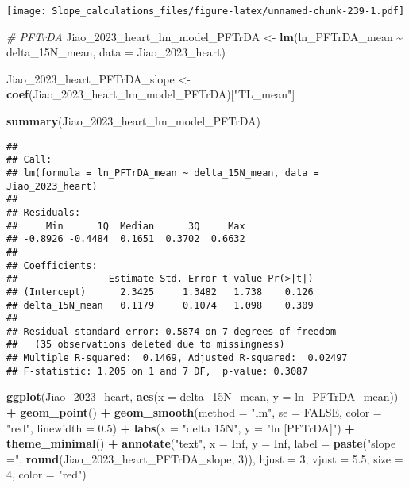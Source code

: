 \documentclass[
]{article}
\newenvironment{Shaded}{\begin{snugshade}}{\end{snugshade}}
\newcommand{\AttributeTok}[1]{\textcolor[rgb]{0.13,0.29,0.53}{#1}}
\newcommand{\CommentTok}[1]{\textcolor[rgb]{0.56,0.35,0.01}{\textit{#1}}}
\newcommand{\ConstantTok}[1]{\textcolor[rgb]{0.56,0.35,0.01}{#1}}
\newcommand{\DecValTok}[1]{\textcolor[rgb]{0.00,0.00,0.81}{#1}}
\newcommand{\FloatTok}[1]{\textcolor[rgb]{0.00,0.00,0.81}{#1}}
\newcommand{\FunctionTok}[1]{\textcolor[rgb]{0.13,0.29,0.53}{\textbf{#1}}}
\newcommand{\NormalTok}[1]{#1}
\newcommand{\OtherTok}[1]{\textcolor[rgb]{0.56,0.35,0.01}{#1}}
\newcommand{\SpecialCharTok}[1]{\textcolor[rgb]{0.81,0.36,0.00}{\textbf{#1}}}
\newcommand{\StringTok}[1]{\textcolor[rgb]{0.31,0.60,0.02}{#1}}
\begin{document}
\texttt{[image: Slope\_calculations\_files/figure-latex/unnamed-chunk-239-1.pdf]}

\begin{Shaded}
\begin{Highlighting}[]
\CommentTok{\# PFTrDA}
\NormalTok{Jiao\_2023\_heart\_lm\_model\_PFTrDA }\OtherTok{\textless{}{-}} \FunctionTok{lm}\NormalTok{(ln\_PFTrDA\_mean }\SpecialCharTok{\textasciitilde{}}\NormalTok{ delta\_15N\_mean,}
                                    \AttributeTok{data =}\NormalTok{ Jiao\_2023\_heart)}

\NormalTok{Jiao\_2023\_heart\_PFTrDA\_slope }\OtherTok{\textless{}{-}} \FunctionTok{coef}\NormalTok{(Jiao\_2023\_heart\_lm\_model\_PFTrDA)[}\StringTok{"TL\_mean"}\NormalTok{]}

\FunctionTok{summary}\NormalTok{(Jiao\_2023\_heart\_lm\_model\_PFTrDA)}
\end{Highlighting}
\end{Shaded}

\begin{verbatim}
## 
## Call:
## lm(formula = ln_PFTrDA_mean ~ delta_15N_mean, data = Jiao_2023_heart)
## 
## Residuals:
##     Min      1Q  Median      3Q     Max 
## -0.8926 -0.4484  0.1651  0.3702  0.6632 
## 
## Coefficients:
##                Estimate Std. Error t value Pr(>|t|)
## (Intercept)      2.3425     1.3482   1.738    0.126
## delta_15N_mean   0.1179     0.1074   1.098    0.309
## 
## Residual standard error: 0.5874 on 7 degrees of freedom
##   (35 observations deleted due to missingness)
## Multiple R-squared:  0.1469, Adjusted R-squared:  0.02497 
## F-statistic: 1.205 on 1 and 7 DF,  p-value: 0.3087
\end{verbatim}

\begin{Shaded}
\begin{Highlighting}[]
\FunctionTok{ggplot}\NormalTok{(Jiao\_2023\_heart, }\FunctionTok{aes}\NormalTok{(}\AttributeTok{x =}\NormalTok{ delta\_15N\_mean, }\AttributeTok{y =}\NormalTok{ ln\_PFTrDA\_mean)) }\SpecialCharTok{+}
  \FunctionTok{geom\_point}\NormalTok{() }\SpecialCharTok{+}
  \FunctionTok{geom\_smooth}\NormalTok{(}\AttributeTok{method =} \StringTok{"lm"}\NormalTok{, }\AttributeTok{se =} \ConstantTok{FALSE}\NormalTok{, }\AttributeTok{color =} \StringTok{"red"}\NormalTok{, }\AttributeTok{linewidth =} \FloatTok{0.5}\NormalTok{) }\SpecialCharTok{+}
  \FunctionTok{labs}\NormalTok{(}\AttributeTok{x =} \StringTok{"delta 15N"}\NormalTok{,}
       \AttributeTok{y =} \StringTok{"ln [PFTrDA]"}\NormalTok{) }\SpecialCharTok{+}
  \FunctionTok{theme\_minimal}\NormalTok{() }\SpecialCharTok{+}
  \FunctionTok{annotate}\NormalTok{(}\StringTok{"text"}\NormalTok{, }\AttributeTok{x =} \ConstantTok{Inf}\NormalTok{, }\AttributeTok{y =} \ConstantTok{Inf}\NormalTok{, }\AttributeTok{label =} \FunctionTok{paste}\NormalTok{(}\StringTok{"slope ="}\NormalTok{, }\FunctionTok{round}\NormalTok{(Jiao\_2023\_heart\_PFTrDA\_slope, }\DecValTok{3}\NormalTok{)), }
           \AttributeTok{hjust =} \DecValTok{3}\NormalTok{, }\AttributeTok{vjust =} \FloatTok{5.5}\NormalTok{, }\AttributeTok{size =} \DecValTok{4}\NormalTok{, }\AttributeTok{color =} \StringTok{"red"}\NormalTok{)}
\end{Highlighting}
\end{Shaded}
\end{document}
